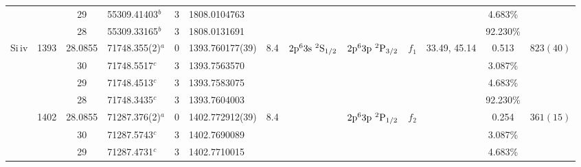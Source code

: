 \begin{table*}
\begin{center}
{\begin{tabular}{:l;l;c;l;c;l;c;l;l;c;c;c;c}
\rowstyle{\itshape}               &        & 29        & 55309.41403$^{b}$                & 3 &  1808.0104763      &      & $                                        $ & $                                        $ & $      $ &              & 4.683\%   & $          $\\
\rowstyle{\itshape}               &        & 28        & 55309.33165$^{b}$                & 3 &  1808.0131691      &      & $                                        $ & $                                        $ & $      $ &              & 92.230\%  & $          $\\
                    Si{\sc \,iv}  & 1393   & 28.0855   & 71748.355(2)$^{a}$               & 0 &   1393.760177(39)  &  8.4 & $2\rm{p}^63\rm{s}~^2\rm{S}_{1/2}         $ & $2\rm{p}^63\rm{p}~^2\rm{P}_{3/2}         $ & $f_{1} $ & 33.49, 45.14 & 0.513     & $  823(40) $\\
\rowstyle{\itshape}               &        & 30        & 71748.5517$^{c}$                 & 3 &  1393.7563570      &      & $                                        $ & $                                        $ & $      $ &              & 3.087\%   & $          $\\
\rowstyle{\itshape}               &        & 29        & 71748.4513$^{c}$                 & 3 &  1393.7583075      &      & $                                        $ & $                                        $ & $      $ &              & 4.683\%   & $          $\\
\rowstyle{\itshape}               &        & 28        & 71748.3435$^{c}$                 & 3 &  1393.7604003      &      & $                                        $ & $                                        $ & $      $ &              & 92.230\%  & $          $\\
                                  & 1402   & 28.0855   & 71287.376(2)$^{a}$               & 0 &   1402.772912(39)  &  8.4 & $                                        $ & $2\rm{p}^63\rm{p}~^2\rm{P}_{1/2}         $ & $f_{2} $ &              & 0.254     & $  361(15) $\\
\rowstyle{\itshape}               &        & 30        & 71287.5743$^{c}$                 & 3 &  1402.7690089      &      & $                                        $ & $                                        $ & $      $ &              & 3.087\%   & $          $\\
\rowstyle{\itshape}               &        & 29        & 71287.4731$^{c}$                 & 3 &  1402.7710015      &      & $                                        $ & $                                        $ & $      $ &              & 4.683\%   & $          $\\

\end{tabular}}
\end{center}
\end{table*}
